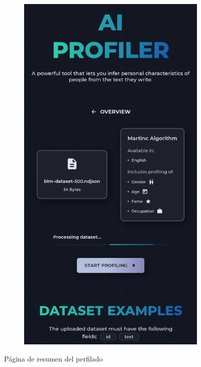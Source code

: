 \begin{figure}[H]
\begin{subfigure}[c]{0.21\textwidth}
		\includegraphics[width=\textwidth]{imagenes/overview_movil.png}
		\label{fig:casouso_overview_movil}
	\end{subfigure}
	\vspace{-1\baselineskip}
	\caption{Página de resumen del perfilado}
	\label{fig:casouso_overview}
\end{figure}

